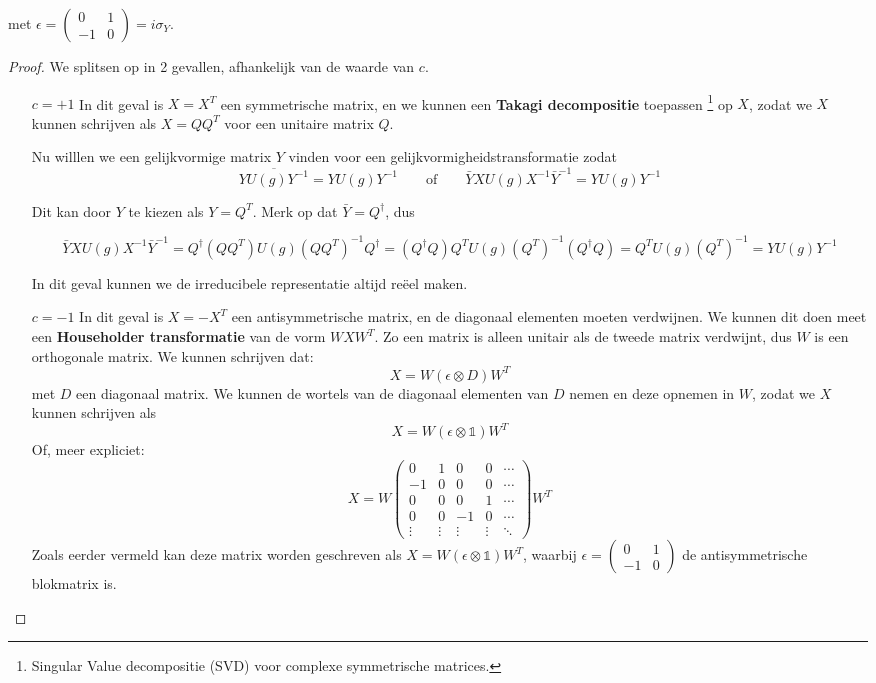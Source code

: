 met \(\epsilon = \begin{pmatrix} 0 & 1 \\ -1 & 0 \end{pmatrix} = i \sigma_Y\).
\begin{proof}
    We splitsen op in 2 gevallen, afhankelijk van de waarde van \(c\).  
\begin{itemize}
    \item[\(c=+1\)] 
    In dit geval is \(X = X^T\) een symmetrische matrix,
    en we kunnen een \textbf{Takagi decompositie} toepassen \footnote{Singular Value decompositie (SVD) voor complexe symmetrische matrices.}
    op \(X\), zodat we \(X\) kunnen schrijven als \(X = QQ^T\) voor een unitaire matrix \(Q\). 
    
    Nu willlen we een gelijkvormige matrix \(Y\) vinden voor een gelijkvormigheidstransformatie zodat 
    \[\overline{YU(g)Y^{-1}} = Y U(g) Y^{-1} \qquad \text{of} \qquad \bar{Y}XU(g)X^{-1}\bar{Y}^{-1} = YU(g)Y^{-1}\]
    
    Dit kan door \(Y\) te kiezen als \(\boxed{Y = Q^{T}}\). Merk op dat \(\bar{Y}=Q^{\dagger}\), dus

    \[\bar{Y}XU(g)X^{-1}\bar{Y}^{-1} = Q^{\dagger}(QQ^{T})U(g)(QQ^{T})^{-1}Q^{\dagger}
    = (Q^{\dagger}Q)Q^{T}U(g)(Q^{T})^{-1}(Q^{\dagger}Q) = Q^{T}U(g)(Q^{T})^{-1} = YU(g)Y^{-1}\]
    
    In dit geval kunnen we de irreducibele representatie altijd reëel maken.

    \item[\(c=-1\)]
    In dit geval is \(X = -X^T\) een antisymmetrische matrix, en de diagonaal elementen moeten verdwijnen.
    We kunnen dit doen meet een \textbf{Householder transformatie} van de vorm \(WXW^T\).
    Zo een matrix is alleen unitair als de tweede matrix verdwijnt, dus \(W\) is een orthogonale matrix. 
    We kunnen schrijven dat:
    \[ X = W (\epsilon \otimes D)W^T \]
    met \(D\) een diagonaal matrix.  We kunnen de wortels van de diagonaal elementen van \(D\) nemen en deze opnemen in \(W\), zodat we \(X\) kunnen schrijven als
    \[X = W(\epsilon \otimes \mathds{1})W^T\] 
    Of, meer expliciet:
    \[X = W \begin{pmatrix}
            0 & 1 & 0 & 0 & \cdots \\
            -1 & 0 & 0 & 0 & \cdots \\
            0 & 0 & 0 & 1 & \cdots \\
            0 & 0 & -1 & 0 & \cdots \\
            \vdots & \vdots & \vdots & \vdots & \ddots
            \end{pmatrix} W^T\]
    Zoals eerder vermeld kan deze matrix worden geschreven als \(X = W (\epsilon \otimes \mathds{1}) W^T\), waarbij \(\epsilon = \begin{pmatrix} 0 & 1 \\ -1 & 0 \end{pmatrix}\) de antisymmetrische blokmatrix is. 


\end{itemize}
\end{proof}
